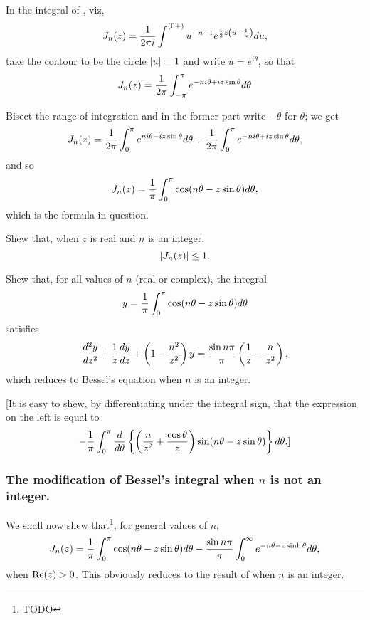 \documentclass{book}
\begin{document}
In the integral of , viz, 
$$
J_n(z) 
=
\frac{1}{2\pi i}
\int^{(0+)}
u^{-n-1}
e^{\frac{1}{2} z \left(  u - \frac{1}{u}  \right)}
d u,
$$
take the contour to be the circle $\left| u \right| = 1$ and write 
$u = e^{i\theta}$, so that
$$
J_n(z)
= 
\frac{1}{2\pi}
\int_{-\pi}^{\pi}
e^{-ni\theta + iz\sin\theta}
d \theta
$$

Bisect the range of integration and in the former part write 
$-\theta$ for $\theta$; we get
$$
J_n(z) 
=
\frac{1}{2\pi}
\int_0^{\pi}
e^{n i \theta - i z \sin\theta}
d \theta
+
\frac{1}{2\pi}
\int_0^{\pi}
e^{-n i \theta + i z \sin\theta}
d \theta,
$$
and so
$$
J_n(z)
=
\frac{1}{\pi}
\int_0^{\pi}
\cos (n \theta - z \sin \theta)
d \theta,
$$
which is the formula in question.
\begin{wandwexample}
  Shew that, when $z$ is real and $n$ is an integer,
  $$
  \left|  J_n(z)  \right| \leq 1.
  $$
\end{wandwexample}
\begin{wandwexample}
  Shew that, for all values of $n$ (real or complex), the integral
  $$
  y
  =
  \frac{1}{\pi}
  \int_0^{\pi}
  \cos (n \theta - z \sin \theta)
  d \theta
  $$
  satisfies
  $$
  \frac{d^2 y}{dz^2}
  +
  \frac{1}{z}
  \frac{dy}{dz}
  +
  \left(  1 - \frac{n^2}{z^2}  \right) y
  =
  \frac{ \sin n\pi }{\pi}
  \left(  \frac{1}{z} - \frac{n}{z^2}   \right),
  $$
  which reduces to Bessel's equation when $n$ is an integer.

[It is easy to shew, by differentiating under the integral sign, that
the expression on the left is equal to
$$
-
\frac{1}{\pi}
\int_0^{\pi}
\frac{d}{d\theta}
\left\{  \left(  \frac{n}{z^2} + \frac{\cos\theta}{z}   \right)
\sin(n\theta - z \sin\theta) \right\}
d \theta
.]
$$
\end{wandwexample}
%
\subsubsection{The modification of Bessel's integral when $n$ is not
  an integer.}
We shall now shew that\footnote{TODO}, for general values of $n$,
\begin{equation}
J_n(z) 
=
\frac{1}{\pi}
\int_0^{\pi} \cos(n\theta - z\sin\theta) d\theta
-
\frac{\sin n\pi}{\pi}
\int_0^{\infty} e^{-n\theta - z\sinh\theta} d\theta,
\end{equation}
when $\mathrm{Re}(z) > 0$. This obviously reduces to the result of
 when $n$ is an integer.
\end{document}

